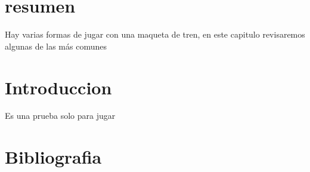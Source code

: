 \section{resumen}
Hay varias formas de jugar con una maqueta de tren, en este capitulo revisaremos algunas de las más comunes
\section{Introduccion}
\cite{ackerberg2006} Es una prueba solo para jugar
\section{Bibliografia}
\printbibliography[heading=subbibliography]